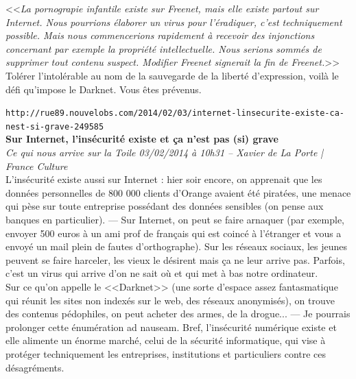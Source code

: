 \documentclass[11pt,twoside,a4paper]{article}
\begin{document}
<<\emph{La pornograpie infantile existe sur Freenet, mais elle existe partout sur Internet. Nous pourrions {\'e}laborer un virus pour l'{\'e}radiquer, c'est techniquement possible. Mais nous commencerions rapidement {\`a} recevoir des injonctions concernant par exemple la propri{\'e}t{\'e} intellectuelle. Nous serions somm{\'e}s de supprimer tout contenu suspect. Modifier Freenet signerait la fin de Freenet.}>> Tol{\'e}rer l'intol{\'e}rable au nom de la sauvegarde de la libert{\'e} d'expression, voil{\`a} le d{\'e}fi qu'impose le Darknet. Vous {\^e}tes pr{\'e}venus. ~\\ 

\dotfill %

\texttt{http://rue89.nouvelobs.com/2014/02/03/internet-linsecurite-existe-ca-nest-si-grave-249585}~\\

\textbf{Sur Internet, l'ins{\'e}curit{\'e} existe et \c{c}a n'est pas (si) grave}~\\

\emph{\small Ce qui nous arrive sur la Toile 03/02/2014 {\`a} 10h31 -- Xavier de La Porte | France Culture }~\\

L'ins{\'e}curit{\'e} existe aussi sur Internet : hier soir encore, on apprenait que les donn{\'e}es personnelles de 800 000 clients d'Orange avaient {\'e}t{\'e} pirat{\'e}es, une menace qui p{\`e}se sur toute entreprise poss{\'e}dant des donn{\'e}es sensibles (on pense aux banques en particulier). --- Sur Internet, on peut se faire arnaquer (par exemple, envoyer 500 euros {\`a} un ami prof de fran\c{c}ais qui est coinc{\'e} {\`a} l'{\'e}tranger et vous a envoy{\'e} un mail plein de fautes d'orthographe). Sur les r{\'e}seaux sociaux, les jeunes peuvent se faire harceler, les vieux le d{\'e}sirent mais \c{c}a ne leur arrive pas. Parfois, c'est un virus qui arrive d'on ne sait o{\`u} et qui met {\`a} bas notre ordinateur. ~\\

Sur ce qu'on appelle le <<Darknet>> (une sorte d'espace assez fantasmatique qui r{\'e}unit les sites non index{\'e}s sur le web, des r{\'e}seaux anonymis{\'e}s), on trouve des contenus p{\'e}dophiles, on peut acheter des armes, de la drogue... --- Je pourrais prolonger cette {\'e}num{\'e}ration ad nauseam. Bref, l'ins{\'e}curit{\'e} num{\'e}rique existe et elle alimente un {\'e}norme march{\'e}, celui de la s{\'e}curit{\'e} informatique, qui vise {\`a} prot{\'e}ger techniquement les entreprises, institutions et particuliers contre ces d{\'e}sagr{\'e}ments. ~\\
\end{document}
